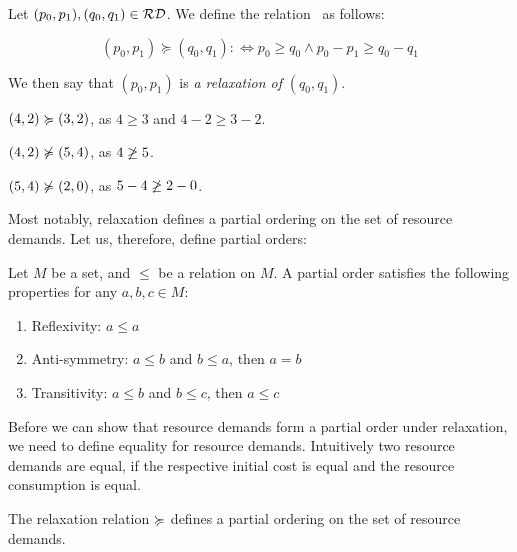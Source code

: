 \begin{definition}[Relaxation]\label{def:relaxation}
   Let \((p_0, p_1), (q_0, q_1) \in \mathcal{RD}\). We define the relation \relaxation ~as follows:

   \[
      (p_0, p_1) \succcurlyeq (q_0, q_1) :\iff p_0 \geq q_0 \wedge p_0 - p_1 \geq q_0 - q_1
   \]
\end{definition}

We then say that \((p_0, p_1)\) is \emph{a relaxation of} \((q_0, q_1)\).


\begin{example}
   \((4, 2) \succcurlyeq (3, 2)\), as \(4 \geq 3\) and \(4 - 2 \geq 3 - 2\).
\end{example}

\begin{example}
   \((4,2) \notrelaxation (5, 4)\), as \(4 \centernot \geq 5\).
\end{example}

\begin{example}
   \((5, 4) \notrelaxation (2, 0)\), as \(5 - 4 \centernot{\geq} 2 - 0\).
\end{example}

Most notably, relaxation defines a partial ordering on the set of resource demands. Let us, therefore, define partial orders:

\begin{definition}
   Let \(M\) be a set, and \(\leq\) be a relation on \(M\). A partial order satisfies the following properties for any \(a, b, c \in M\):
   \begin{enumerate}[label=\Roman*]
      \item Reflexivity: \(a \leq a \) 
      \item Anti-symmetry: \(a \leq b\) and \(b \leq a\), then \(a = b\) 
      \item Transitivity: \(a \leq b\) and \(b \leq c\), then \(a \leq c\)
   \end{enumerate}
\end{definition}

Before we can show that resource demands form a partial order under relaxation, we need to define equality for resource demands. Intuitively two resource demands are equal, if the respective initial cost is equal and the resource consumption is equal. 

\begin{lemma}
   The relaxation relation \(\succcurlyeq\) defines a partial ordering on the set of resource demands.
\end{lemma}

